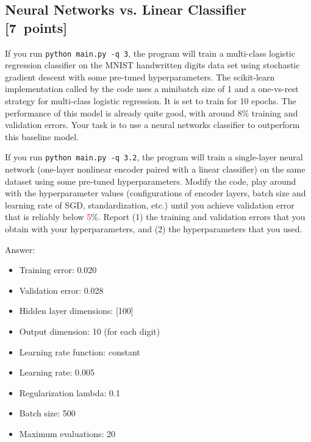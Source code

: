 \documentclass{article}
\newcommand{\blu}[1]{{\textcolor{blu}{#1}}}
\newcommand{\red}[1]{\textcolor{red}{#1}}
\newenvironment{answer}{\par\begingroup\color{gre}Answer: }{\endgroup}
\let\ask\blu
\newcommand\pts[1]{\textcolor{pointscolour}{[#1~points]}}
\begin{document}
\subsection{Neural Networks vs. Linear Classifier \pts{7}}


If you run \texttt{python main.py -q 3}, the program will train a multi-class logistic regression classifier on the MNIST handwritten digits data set using stochastic gradient descent with some pre-tuned hyperparameters.
The scikit-learn implementation called by the code uses a minibatch size of 1 and a one-vs-rest strategy for multi-class logistic regression. It is set to train for 10 epochs.
The performance of this model is already quite good, with around 8\% training and validation errors. Your task is to use a neural networks classifier to outperform this baseline model.

If you run \texttt{python main.py -q 3.2}, the program will train a single-layer neural network (one-layer nonlinear encoder paired with a linear classifier) on the same dataset using some pre-tuned hyperparameters. Modify the code, play around with the hyperparameter values (configurations of encoder layers, batch size and learning rate of SGD, standardization, etc.) until you achieve validation error that is reliably below \red{5}\%. \ask{Report (1) the training and validation errors that you obtain with your hyperparameters, and (2) the hyperparameters that you used.}

\begin{answer}
    \begin{itemize}
        \item Training error:  0.020
        \item Validation error: 0.028
        \item Hidden layer dimensions: [100]
        \item Output dimension: 10 (for each digit)
        \item Learning rate function: constant
        \item Learning rate: 0.005
        \item Regularization lambda: 0.1
        \item Batch size: 500
        \item Maximum evaluations: 20
    \end{itemize}
\end{answer}
\end{document}
